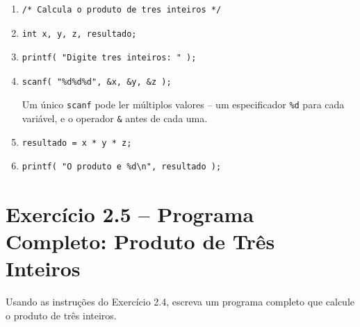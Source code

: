 \documentclass[12pt,a4paper]{article}
\begin{document}
\begin{respostabox}
\begin{enumerate}[label=\textbf{\alph*)}]
\item \begin{lstlisting}
/* Calcula o produto de tres inteiros */
\end{lstlisting}
\item \begin{lstlisting}
int x, y, z, resultado;
\end{lstlisting}
\item \begin{lstlisting}
printf( "Digite tres inteiros: " );
\end{lstlisting}
\item \begin{lstlisting}
scanf( "%d%d%d", &x, &y, &z );
\end{lstlisting}
Um único \texttt{scanf} pode ler múltiplos valores -- um especificador \texttt{\%d} para
cada variável, e o operador \texttt{\&} antes de cada uma.
\item \begin{lstlisting}
resultado = x * y * z;
\end{lstlisting}
\item \begin{lstlisting}
printf( "O produto e %d\n", resultado );
\end{lstlisting}
\end{enumerate}
\end{respostabox}

\section{Exercício 2.5 -- Programa Completo: Produto de Três Inteiros}

\begin{enunciadoBox}[Enunciado 2.5]
Usando as instruções do Exercício 2.4, escreva um programa completo que calcule o
produto de três inteiros.
\end{enunciadoBox}
\end{document}

